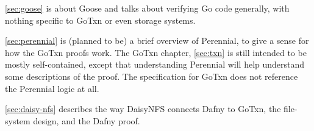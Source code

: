 \autoref{sec:goose} is about Goose and talks about verifying Go code generally,
with nothing specific to GoTxn or even storage systems.

\autoref{sec:perennial} is (planned to be) a brief overview of Perennial, to
give a sense for how the GoTxn proofs work. The GoTxn chapter, \autoref{sec:txn}
is still intended to be mostly self-contained, except that understanding
Perennial will help understand some descriptions of the proof. The specification
for GoTxn does not reference the Perennial logic at all.

\autoref{sec:daisy-nfs} describes the way DaisyNFS connects Dafny to GoTxn, the
file-system design, and the Dafny proof.
